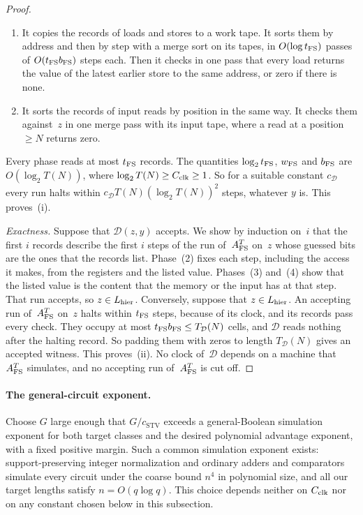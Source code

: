 \documentclass[11pt,letterpaper]{article}
\theoremstyle{definition}
\theoremstyle{remark}
\begin{document}
\begin{proof}
\begin{enumerate}[label=(\arabic*)]
\item It copies the records of loads and stores to a work tape. It sorts
them by address and then by step with a merge sort on its tapes, in
$O(\log t_{\rm FS})$ passes of $O(t_{\rm FS}b_{\rm FS})$ steps each. Then
it checks in one pass that every load returns the value of the latest
earlier store to the same address, or zero if there is none.

\item It sorts the records of input reads by position in the same way.
It checks them against~$z$ in one merge pass with its input tape, where
a read at a position $\ge N$ returns zero.
\end{enumerate}
Every phase reads at most $t_{\rm FS}$ records. The quantities
$\log_2t_{\rm FS}$, $w_{\rm FS}$ and $b_{\rm FS}$ are $O(\log_2T(N))$,
where $\log_2T(N)\ge C_{\rm clk}\ge1$. So for a suitable constant
$c_{\mathcal D}$ every run halts within
$c_{\mathcal D}T(N)(\log_2T(N))^2$ steps, whatever $y$ is. This
proves~(i).

\emph{Exactness.} Suppose that $\mathcal D(z,y)$ accepts. We show by
induction on~$i$ that the first $i$ records describe the first $i$
steps of the run of~$A^T_{\rm FS}$ on~$z$ whose guessed bits are the
ones that the records list. Phase~(2) fixes each step, including the
access it makes, from the registers and the listed value. Phases~(3)
and~(4) show that the listed value is the content that the memory or the
input has at that step. That run accepts, so $z\in L_{\rm hier}$.
Conversely, suppose that $z\in L_{\rm hier}$. An accepting run
of~$A^T_{\rm FS}$ on~$z$ halts within $t_{\rm FS}$ steps, because of its
clock, and its records pass every check. They occupy at most
$t_{\rm FS}b_{\rm FS}\le T_{\mathcal D}(N)$ cells, and $\mathcal D$
reads nothing after the halting record. So padding them with zeros to
length $T_{\mathcal D}(N)$ gives an accepted witness. This proves~(ii).
No clock of~$\mathcal D$ depends on a machine that $A^T_{\rm FS}$
simulates, and no accepting run of~$A^T_{\rm FS}$ is cut off.
\end{proof}

\paragraph{The general-circuit exponent.}
Choose $G$ large enough that
$G/c_{\mathrm{STV}}$ exceeds a general-Boolean simulation exponent
for both target classes and the desired polynomial advantage exponent,
with a fixed positive margin. Such a common simulation exponent exists:
support-preserving integer normalization and ordinary adders and
comparators simulate every circuit under the coarse bound $n^4$ in
polynomial size, and all our target lengths satisfy $n=O(q\log q)$.
This choice depends neither on $C_{\rm clk}$ nor on any constant chosen
below in this subsection.
\end{document}
